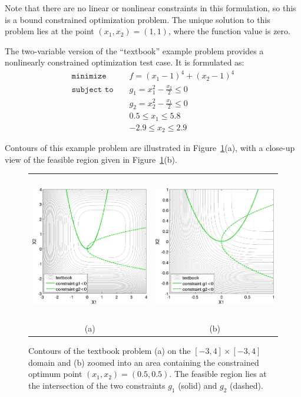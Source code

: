 Note that there are no linear or nonlinear constraints in this
formulation, so this is a bound constrained optimization problem. The
unique solution to this problem lies at the point
$(x_1,x_2) = (1,1)$, where the function value is zero.

The two-variable version of the ``textbook'' example problem provides
a nonlinearly constrained optimization test case. It is formulated as:
\begin{eqnarray}
\texttt{minimize }
& & f = (x_1-1)^{4}+(x_2-1)^{4}     \nonumber \\
\texttt{subject to }
& & g_1 = x_1^2-\frac{x_2}{2} \le 0 \nonumber \\
& & g_2 = x_2^2-\frac{x_1}{2} \le 0 \label{tutorial:textbook_f} \\
& &  0.5 \le x_1 \le 5.8            \nonumber \\
& & -2.9 \le x_2 \le 2.9            \nonumber
\end{eqnarray}

Contours of this example problem are illustrated in
Figure~\ref{tutorial:textbook_prob}(a), with a close-up view of
the feasible region given in
Figure~\ref{tutorial:textbook_prob}(b).

\begin{figure}[htp!]
  \centering
  \begin{tabular}{cc}
  \includegraphics[height=2.5in]{images/textbook_contours} &
  \includegraphics[height=2.5in]{images/textbook_closeup} \\
  (a) & (b) \\
  \end{tabular}
  \caption{Contours of the textbook problem (a) on the $[-3,4] \times
    [-3,4]$ domain and (b) zoomed into an area containing the
    constrained optimum point $(x_1,x_2) = (0.5,0.5)$. The
    feasible region lies at the intersection of the two constraints
    $g_1$ (solid) and $g_2$ (dashed).}
  \label{tutorial:textbook_prob}
\end{figure}

